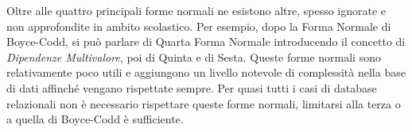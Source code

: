 Oltre alle quattro principali forme normali ne esistono altre, spesso ignorate e non approfondite in ambito scolastico. Per esempio, dopo la Forma Normale di Boyce-Codd, si può parlare di Quarta Forma Normale introducendo il concetto di \emph{Dipendenze Multivalore}, poi di Quinta e di Sesta. Queste forme normali sono relativamente poco utili e aggiungono un livello notevole di complessità nella base di dati affinché vengano rispettate sempre. Per quasi tutti i casi di database relazionali non è necessario rispettare queste forme normali, limitarsi alla terza o a quella di Boyce-Codd è sufficiente.